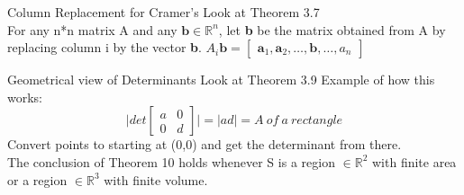 \documentclass[a4paper, 12pt]{article}
\begin{document}
\begin{subsection}{Column Replacement for Cramer's}
Look at Theorem 3.7\\
For any n*n matrix A and any $\textbf{b}\in\mathbb{R}^{n}$, let
\textbf{b} be the matrix obtained from A by replacing column i by the 
vector \textbf{b}.
$A_{i}\textbf{b}=\begin{bmatrix} \textbf{a}_{1}, \textbf{a}_{2},\dots,
\textbf{b},\dots, a_{n} \end{bmatrix}$
\end{subsection}
\begin{subsection}{Geometrical view of Determinants}
Look at Theorem 3.9
Example of how this works:
\begin{equation}
\lvert det\begin{bmatrix} a&0\\0&d \end{bmatrix} \rvert = 
\lvert ad \rvert = A~of~a~rectangle
\end{equation}
Convert points to starting at (0,0) and get the determinant from there. \\
The conclusion of Theorem 10 holds whenever S is a region $\in\mathbb{R}^2$
with finite area or a region $\in\mathbb{R}^{3}$ with finite volume. \\

\end{subsection}
\end{document}
